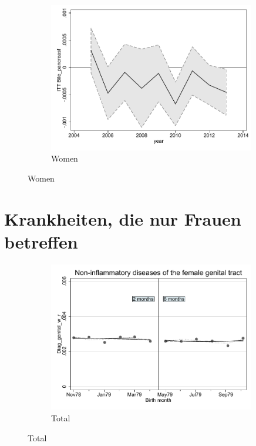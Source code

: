 \documentclass[a4paper ]{article}
\begin{document}
\begin{figure}[h!]
\begin{subfigure}[t]{0.31\textwidth}
		\includegraphics[width=0.99\textwidth]{R1_LC_Bile_pancreasf}
		\caption{Women}
	\end{subfigure}
\end{figure}
\newpage
\section{Krankheiten, die nur Frauen betreffen}
\begin{figure}[h]
	\centering
	\begin{subfigure}[t]{0.5\textwidth}
		\centering
		\includegraphics[width=0.99\textwidth]{R1_RD_Diag_genital_w_r_fits}
		\caption{Total}		
	\end{subfigure}
\end{figure}
\end{document}

